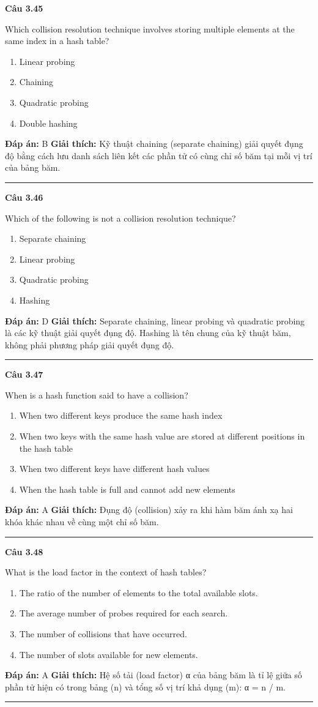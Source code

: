 \documentclass[11pt,a4paper]{article}
\newenvironment{question}[1]{%
  \par\vspace{1em}\noindent\textbf{\large Câu #1}\par\vspace{0.4em}
}{%
  \par\vspace{1em}\hrule\vspace{0.6em}
}
\newenvironment{choices}{%
  \begin{enumerate}[label=\textbf{\Alph*.},leftmargin=2.2em,itemsep=2pt,topsep=3pt]
}{%
  \end{enumerate}
}
\newcommand{\choice}{\item}
\begin{document}
\begin{question}{3.45}
Which collision resolution technique involves storing multiple elements at the same index in a hash table?
\begin{choices}
\choice Linear probing
\choice Chaining
\choice Quadratic probing
\choice Double hashing
\end{choices}
\textbf{Đáp án:} B
\textbf{Giải thích:} Kỹ thuật chaining (separate chaining) giải quyết đụng độ bằng cách lưu danh sách liên kết các phần tử có cùng chỉ số băm tại mỗi vị trí của bảng băm.
\end{question}

\begin{question}{3.46}
Which of the following is not a collision resolution technique?
\begin{choices}
\choice Separate chaining
\choice Linear probing
\choice Quadratic probing
\choice Hashing
\end{choices}
\textbf{Đáp án:} D
\textbf{Giải thích:} Separate chaining, linear probing và quadratic probing là các kỹ thuật giải quyết đụng độ. Hashing là tên chung của kỹ thuật băm, không phải phương pháp giải quyết đụng độ.
\end{question}

\begin{question}{3.47}
When is a hash function said to have a collision?
\begin{choices}
\choice When two different keys produce the same hash index
\choice When two keys with the same hash value are stored at different positions in the hash table
\choice When two different keys have different hash values
\choice When the hash table is full and cannot add new elements
\end{choices}
\textbf{Đáp án:} A
\textbf{Giải thích:} Đụng độ (collision) xảy ra khi hàm băm ánh xạ hai khóa khác nhau về cùng một chỉ số băm.
\end{question}

\begin{question}{3.48}
What is the load factor in the context of hash tables?
\begin{choices}
\choice The ratio of the number of elements to the total available slots.
\choice The average number of probes required for each search.
\choice The number of collisions that have occurred.
\choice The number of slots available for new elements.
\end{choices}
\textbf{Đáp án:} A
\textbf{Giải thích:} Hệ số tải (load factor) α của bảng băm là tỉ lệ giữa số phần tử hiện có trong bảng (n) và tổng số vị trí khả dụng (m): α = n / m.
\end{question}
\end{document}
